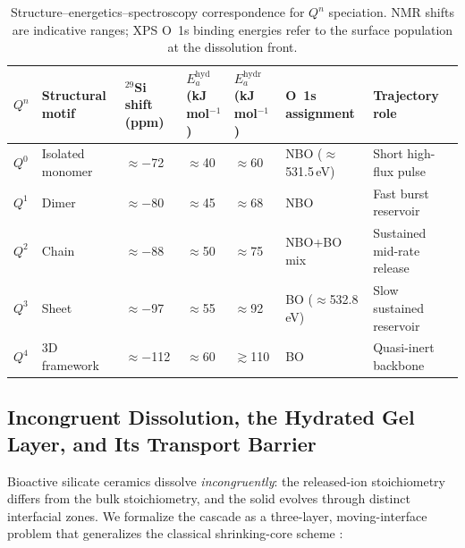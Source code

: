 \documentclass[11pt]{article}
\newcommand{\tablesize}{\fontsize{8.5pt}{10pt}\selectfont}
\begin{document}
\begin{table}[htbp]
\centering
\caption{Structure--energetics--spectroscopy correspondence for $Q^n$ speciation. NMR shifts are indicative ranges; XPS O~1s binding energies refer to the surface population at the dissolution front.}
\label{tab:Qn}
\tablesize
\begin{tabular}{C{1.1cm} L{2.5cm} C{1.5cm} C{1.7cm} C{1.8cm} C{2.1cm} C{2.4cm}}
\toprule
{}
\textbf{$Q^n$} & \textbf{Structural motif} & \textbf{$^{29}$Si shift (ppm)} & \textbf{$E_{a}^{\mathrm{hyd}}$ (kJ\,mol$^{-1}$)} & \textbf{$E_{a}^{\mathrm{hydr}}$ (kJ\,mol$^{-1}$)} & \textbf{O~1s assignment} & \textbf{Trajectory role} \\
\midrule
$Q^0$ & Isolated monomer & $\approx$$-$72 & $\approx$40 & $\approx$60 & NBO ($\approx$531.5\,eV) & Short high-flux pulse \\
$Q^1$ & Dimer & $\approx$$-$80 & $\approx$45 & $\approx$68 & NBO & Fast burst reservoir \\
$Q^2$ & Chain & $\approx$$-$88 & $\approx$50 & $\approx$75 & NBO+BO mix & Sustained mid-rate release \\
$Q^3$ & Sheet & $\approx$$-$97 & $\approx$55 & $\approx$92 & BO ($\approx$532.8\,eV) & Slow sustained reservoir \\
$Q^4$ & 3D framework & $\approx$$-$112 & $\approx$60 & $\gtrsim$110 & BO & Quasi-inert backbone \\
\bottomrule
\end{tabular}
\end{table}


\subsection{Incongruent Dissolution, the Hydrated Gel Layer, and Its Transport Barrier}
\label{sec:gel}


Bioactive silicate ceramics dissolve \emph{incongruently}: the released-ion stoichiometry differs from the bulk stoichiometry, and the solid evolves through distinct interfacial zones. We formalize the cascade as a three-layer, moving-interface problem that generalizes the classical shrinking-core scheme \cite{Crank1984,Smallwood1999}:
\end{document}
